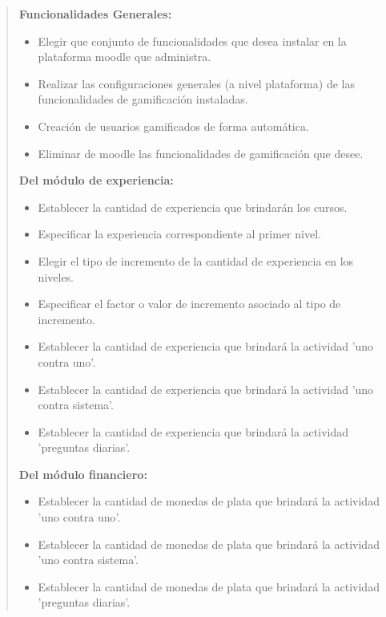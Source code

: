    \begin{quote}
    {\bf Funcionalidades Generales:}
        \begin{itemize}
        \item Elegir que conjunto de funcionalidades que desea instalar
              en la plataforma moodle que administra.
        \item Realizar las configuraciones generales (a nivel plataforma) de las
              funcionalidades de gamificación instaladas.
        \item Creación de usuarios gamificados de forma automática.
        \item Eliminar de moodle las funcionalidades de gamificación que desee.
        \end{itemize}

    {\bf Del módulo de experiencia:}
        \begin{itemize}
        \item Establecer la cantidad de experiencia que brindarán los cursos.
        \item Especificar la experiencia correspondiente al primer nivel.
        \item Elegir el tipo de incremento de la cantidad de experiencia en los niveles.
        \item Especificar el factor o valor de incremento asociado al tipo de incremento.
        \item Establecer la cantidad de experiencia que brindará la actividad 'uno contra uno'.
        \item Establecer la cantidad de experiencia que brindará la actividad 'uno contra sistema'.
        \item Establecer la cantidad de experiencia que brindará la actividad 'preguntas diarias'.
        \end{itemize}

    {\bf Del módulo financiero:}
        \begin{itemize}
        \item Establecer la cantidad de monedas de plata que brindará la actividad 'uno contra uno'.
        \item Establecer la cantidad de monedas de plata que brindará la actividad 'uno contra sistema'.
        \item Establecer la cantidad de monedas de plata que brindará la actividad 'preguntas diarias'.
        \end{itemize}




\end{quote}

